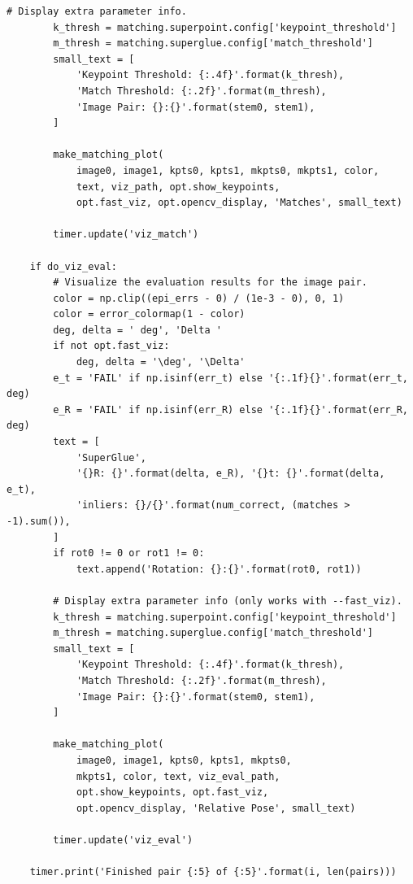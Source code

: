 \documentclass[letterpaper,12pt]{article}
\begin{document}
\begin{lstlisting}[caption={Sample Code Snippet for Evaluation},captionpos=b]
        # Display extra parameter info.
        k_thresh = matching.superpoint.config['keypoint_threshold']
        m_thresh = matching.superglue.config['match_threshold']
        small_text = [
            'Keypoint Threshold: {:.4f}'.format(k_thresh),
            'Match Threshold: {:.2f}'.format(m_thresh),
            'Image Pair: {}:{}'.format(stem0, stem1),
        ]

        make_matching_plot(
            image0, image1, kpts0, kpts1, mkpts0, mkpts1, color,
            text, viz_path, opt.show_keypoints,
            opt.fast_viz, opt.opencv_display, 'Matches', small_text)

        timer.update('viz_match')

    if do_viz_eval:
        # Visualize the evaluation results for the image pair.
        color = np.clip((epi_errs - 0) / (1e-3 - 0), 0, 1)
        color = error_colormap(1 - color)
        deg, delta = ' deg', 'Delta '
        if not opt.fast_viz:
            deg, delta = '\deg', '\Delta'
        e_t = 'FAIL' if np.isinf(err_t) else '{:.1f}{}'.format(err_t, deg)
        e_R = 'FAIL' if np.isinf(err_R) else '{:.1f}{}'.format(err_R, deg)
        text = [
            'SuperGlue',
            '{}R: {}'.format(delta, e_R), '{}t: {}'.format(delta, e_t),
            'inliers: {}/{}'.format(num_correct, (matches > -1).sum()),
        ]
        if rot0 != 0 or rot1 != 0:
            text.append('Rotation: {}:{}'.format(rot0, rot1))

        # Display extra parameter info (only works with --fast_viz).
        k_thresh = matching.superpoint.config['keypoint_threshold']
        m_thresh = matching.superglue.config['match_threshold']
        small_text = [
            'Keypoint Threshold: {:.4f}'.format(k_thresh),
            'Match Threshold: {:.2f}'.format(m_thresh),
            'Image Pair: {}:{}'.format(stem0, stem1),
        ]

        make_matching_plot(
            image0, image1, kpts0, kpts1, mkpts0,
            mkpts1, color, text, viz_eval_path,
            opt.show_keypoints, opt.fast_viz,
            opt.opencv_display, 'Relative Pose', small_text)

        timer.update('viz_eval')

    timer.print('Finished pair {:5} of {:5}'.format(i, len(pairs)))


\end{lstlisting}
\end{document}
